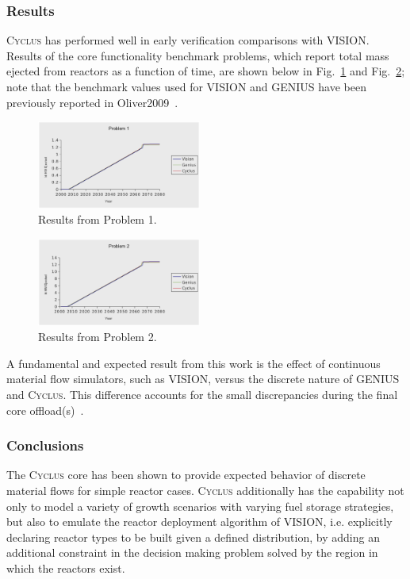 \documentclass{anstrans}
\begin{document}
\subsubsection{Results}
\textsc{Cyclus} has performed well in early verification comparisons with VISION.
Results of the core functionality benchmark problems, which report total mass 
ejected from reactors as a function of time, are shown below in Fig.~\ref{fig:p1} 
and Fig.~\ref{fig:p2}; note that the benchmark values used for VISION and GENIUS have 
been previously reported in Oliver2009~\cite{oliver2009}.
\begin{figure}[ht]
  \centering
  \includegraphics[width=0.48\textwidth]{p1.ps}
  \caption{Results from Problem 1.}
  \label{fig:p1}
\end{figure}
\begin{figure}[ht]
  \centering
  \includegraphics[width=0.48\textwidth]{p2.ps}
  \caption{Results from Problem 2.}
  \label{fig:p2}
\end{figure}

A fundamental and expected result from this work is the effect of continuous
material flow simulators, such as VISION, versus the discrete nature of 
GENIUS and \textsc{Cyclus}. This difference accounts for the small discrepancies
during the final core offload(s)~\cite{oliver2009}.

\subsubsection{Conclusions}
The \textsc{Cyclus} core has been shown to provide expected behavior of discrete 
material flows for simple reactor cases. \textsc{Cyclus} additionally has the 
capability not only to model a variety of growth scenarios with varying fuel storage 
strategies, but also to emulate the reactor deployment algorithm of VISION, i.e. 
explicitly declaring reactor types to be built given a defined distribution, by adding 
an additional constraint in the decision making problem solved by the region in
which the reactors exist.
\end{document}
